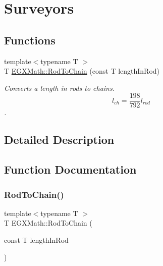 \hypertarget{group___e_g_x_math-_conversions-_length_conversions-_surveyors-_rod-_surveyors}{}\section{Surveyors}
\label{group___e_g_x_math-_conversions-_length_conversions-_surveyors-_rod-_surveyors}
\subsection*{Functions}
\begin{DoxyCompactItemize}
\item 
{\footnotesize template$<$typename T $>$ }\\T \mbox{\hyperlink{group___e_g_x_math-_conversions-_length_conversions-_surveyors-_rod-_surveyors_gaac83cacda4ed47a99bd5c2a04d33df49}{E\+G\+X\+Math\+::\+Rod\+To\+Chain}} (const T length\+In\+Rod)
\begin{DoxyCompactList}\small\item\em Converts a length in rods to chains. \[ l_{ch}= \frac{198}{792} l_{rod} \]. \end{DoxyCompactList}\end{DoxyCompactItemize}


\subsection{Detailed Description}


\subsection{Function Documentation}
\mbox{\label{group___e_g_x_math-_conversions-_length_conversions-_surveyors-_rod-_surveyors_gaac83cacda4ed47a99bd5c2a04d33df49}} 
\subsubsection{\texorpdfstring{Rod\+To\+Chain()}{RodToChain()}}
{\footnotesize\ttfamily template$<$typename T $>$ \\
T E\+G\+X\+Math\+::\+Rod\+To\+Chain (\begin{DoxyParamCaption}\item[{const T}]{length\+In\+Rod }\end{DoxyParamCaption})}



